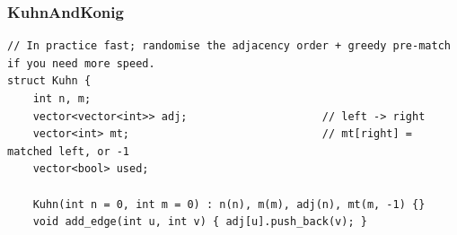 \documentclass[9pt,a4paper,twocolumn]{extarticle}
\begin{document}
\filbreak
\subsubsection{KuhnAndKonig}
\nopagebreak
\begin{lstlisting}
// In practice fast; randomise the adjacency order + greedy pre-match if you need more speed.
struct Kuhn {
    int n, m;
    vector<vector<int>> adj;                     // left -> right
    vector<int> mt;                              // mt[right] = matched left, or -1
    vector<bool> used;

    Kuhn(int n = 0, int m = 0) : n(n), m(m), adj(n), mt(m, -1) {}
    void add_edge(int u, int v) { adj[u].push_back(v); }


\end{lstlisting}
\end{document}
